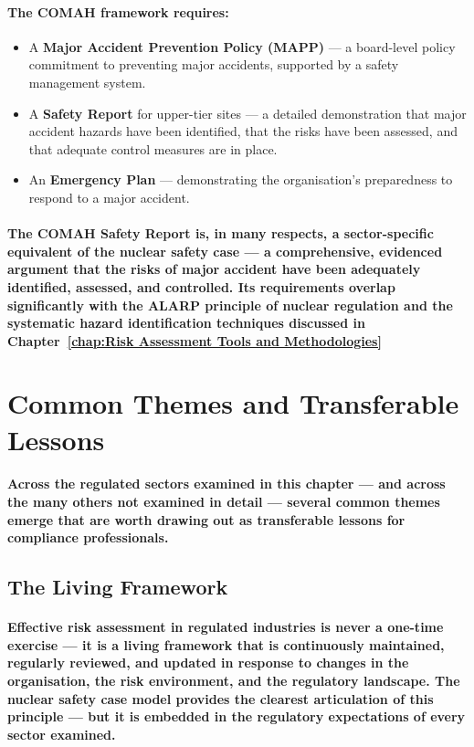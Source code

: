 \paragraph{The COMAH framework requires:}
\begin{itemize}
  \item{A \textbf{Major Accident Prevention Policy (MAPP)} — a board-level policy commitment to preventing major accidents, supported by a safety management system.}
  \item{A \textbf{Safety Report} for upper-tier sites — a detailed demonstration that major accident hazards have been identified, that the risks have been assessed, and that adequate control measures are in place.}
  \item{An \textbf{Emergency Plan} — demonstrating the organisation's preparedness to respond to a major accident.}
\end{itemize}
\paragraph{The COMAH Safety Report is, in many respects, a sector-specific equivalent of the nuclear safety case — a comprehensive, evidenced argument that the risks of major accident have been adequately identified, assessed, and controlled. Its requirements overlap significantly with the ALARP principle of nuclear regulation and the systematic hazard identification techniques discussed in Chapter~\ref{chap:Risk Assessment Tools and Methodologies}}

\section{Common Themes and Transferable Lessons}
\paragraph{Across the regulated sectors examined in this chapter — and across the many others not examined in detail — several common themes emerge that are worth drawing out as transferable lessons for compliance professionals.}

\subsection{The Living Framework}
\paragraph{Effective risk assessment in regulated industries is never a one-time exercise — it is a \textbf{living framework} that is continuously maintained, regularly reviewed, and updated in response to changes in the organisation, the risk environment, and the regulatory landscape. The nuclear safety case model provides the clearest articulation of this principle — but it is embedded in the regulatory expectations of every sector examined.}

